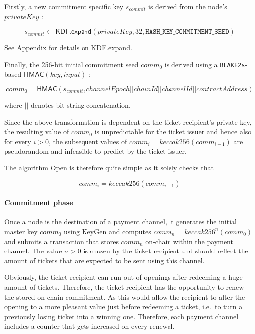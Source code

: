 Firstly, a new commitment specific key $s_{commit}$ is derived from the node's $privateKey$ :

$$ s_{commit} \longleftarrow \mathsf{KDF.expand}(privateKey, 32, \texttt{HASH\_KEY\_COMMITMENT\_SEED})$$

See Appendix for details on \textsf{KDF.expand}.

Finally, the 256-bit initial commitment seed $comm_0$ is derived using a \texttt{BLAKE2s}-based $\mathsf{HMAC}(key, input)$ :

$$ comm_0 = \mathsf{HMAC}(s_{commit}, channelEpoch || chainId || channelId || contractAddress)$$

where $||$ denotes bit string concatenation.

Since the above transformation is dependent on the ticket recipient's private key, the resulting value of $comm_0$ is unpredictable for the ticket issuer and
hence also for every $i > 0$, the subsequent values of $comm_i = keccak256(comm_{i-1})$ are pseudorandom and infeasible to predict by the ticket issuer.

The algorithm \textsf{Open} is therefore quite simple as it solely checks that

$$ comm_i = keccak256 (\widetilde{comm_{i-1}}) $$

\paragraph{Commitment phase}
\label{sec:incentives:commitment:commitmentphase}

Once a node is the destination of a payment channel, it generates the initial master key $comm_0$ using \textsf{KeyGen} and computes $comm_n = keccak256^n(comm_0)$ and submits a transaction that stores $comm_n$ on-chain within the payment channel.
The value $n > 0$ is chosen by the ticket recipient and should reflect the amount of tickets that are expected to be sent using this channel.

Obviously, the ticket recipient can run out of openings after redeeming a huge amount of tickets.
Therefore, the ticket recipient has the opportunity to renew the stored on-chain commitment.
As this would allow the recipient to alter the opening to a more pleasant value just before redeeming a ticket, i.e.\ to turn a previously losing ticket into a winning one.
Therefore, each payment channel includes a counter that gets increased on every renewal.

